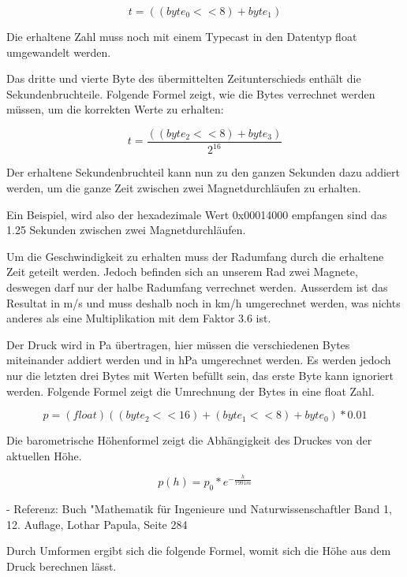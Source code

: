 \begin{equation}
	t = ((byte_0 << 8) + byte_1)
\end{equation}

Die erhaltene Zahl muss noch mit einem Typecast in den Datentyp float umgewandelt werden.

Das dritte und vierte Byte des übermittelten Zeitunterschieds enthält die Sekundenbruchteile. Folgende Formel zeigt, wie die Bytes verrechnet werden müssen, um die korrekten Werte zu erhalten:

\begin{equation}
	t = \frac{((byte_2 << 8) + byte_3)}{2^{16}}
\end{equation}

Der erhaltene Sekundenbruchteil kann nun zu den ganzen Sekunden dazu addiert werden, um die ganze Zeit zwischen zwei Magnetdurchläufen zu erhalten.

Ein Beispiel, wird also der hexadezimale Wert 0x00014000 empfangen sind das 1.25 Sekunden zwischen zwei Magnetdurchläufen.

Um die Geschwindigkeit zu erhalten muss der Radumfang durch die erhaltene Zeit geteilt werden. Jedoch befinden sich an unserem Rad zwei Magnete, deswegen darf nur der halbe Radumfang verrechnet werden. Ausserdem ist das Resultat in m/s und muss deshalb noch in km/h umgerechnet werden, was nichts anderes als eine Multiplikation mit dem Faktor 3.6 ist.

Der Druck wird in Pa übertragen, hier müssen die verschiedenen Bytes miteinander addiert werden und in hPa umgerechnet werden. Es werden jedoch nur die letzten drei Bytes mit Werten befüllt sein, das erste Byte kann ignoriert werden. Folgende Formel zeigt die Umrechnung der Bytes in eine float Zahl.

\begin{equation}
	p = (float)((byte_2 << 16) + (byte_1 << 8) + byte_0) * 0.01
\end{equation}

Die barometrische Höhenformel zeigt die Abhängigkeit des Druckes von der aktuellen Höhe.

\begin{equation}
	p(h) = p_0 * e^{-\frac{h}{7991 m}}
\end{equation}

- Referenz: Buch "Mathematik für Ingenieure und Naturwissenschaftler Band 1, 12. Auflage, Lothar Papula, Seite 284

Durch Umformen ergibt sich die folgende Formel, womit sich die Höhe aus dem Druck berechnen lässt.

